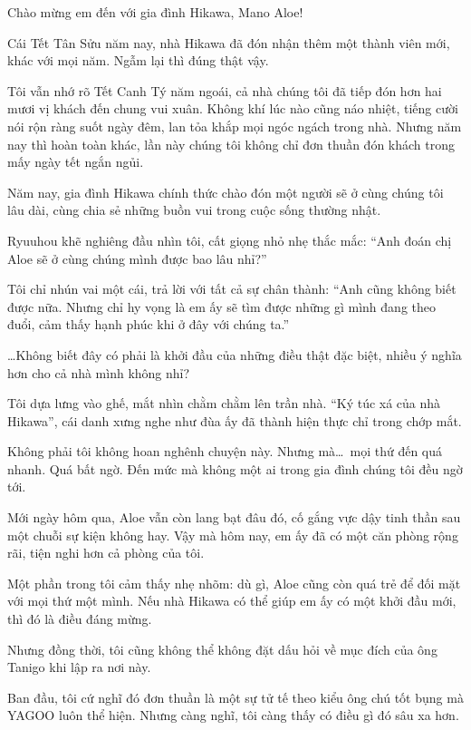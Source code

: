 \documentclass[../main.tex]{subfiles}
\begin{document}
Chào mừng em đến với gia đình Hikawa, Mano Aloe!

\il

Cái Tết Tân Sửu năm nay, nhà Hikawa đã đón nhận thêm một thành viên mới, khác với mọi năm. Ngẫm lại thì đúng thật vậy.

Tôi vẫn nhớ rõ Tết Canh Tý năm ngoái, cả nhà chúng tôi đã tiếp đón hơn hai mươi vị khách đến chung vui xuân. Không khí lúc nào cũng náo nhiệt, tiếng cười nói rộn ràng suốt ngày đêm, lan tỏa khắp mọi ngóc ngách trong nhà. Nhưng năm nay thì hoàn toàn khác, lần này chúng tôi không chỉ đơn thuần đón khách trong mấy ngày tết ngắn ngủi.

Năm nay, gia đình Hikawa chính thức chào đón một người sẽ ở cùng chúng tôi lâu dài, cùng chia sẻ những buồn vui trong cuộc sống thường nhật.

Ryuuhou khẽ nghiêng đầu nhìn tôi, cất giọng nhỏ nhẹ thắc mắc: ``Anh đoán chị Aloe sẽ ở cùng chúng mình được bao lâu nhỉ?''

Tôi chỉ nhún vai một cái, trả lời với tất cả sự chân thành: ``Anh cũng không biết được nữa. Nhưng chỉ hy vọng là em ấy sẽ tìm được những gì mình đang theo đuổi, cảm thấy hạnh phúc khi ở đây với chúng ta.''

\dots Không biết đây có phải là khởi đầu của những điều thật đặc biệt, nhiều ý nghĩa hơn cho cả nhà mình không nhỉ?

\il

Tôi dựa lưng vào ghế, mắt nhìn chằm chằm lên trần nhà. ``Ký túc xá của nhà Hikawa'', cái danh xưng nghe như đùa ấy đã thành hiện thực chỉ trong chớp mắt.

Không phải tôi không hoan nghênh chuyện này. Nhưng mà\dots\ mọi thứ đến quá nhanh. Quá bất ngờ. Đến mức mà không một ai trong gia đình chúng tôi đều ngờ tới.

Mới ngày hôm qua, Aloe vẫn còn lang bạt đâu đó, cố gắng vực dậy tinh thần sau một chuỗi sự kiện không hay. Vậy mà hôm nay, em ấy đã có một căn phòng rộng rãi, tiện nghi hơn cả phòng của tôi.

Một phần trong tôi cảm thấy nhẹ nhõm: dù gì, Aloe cũng còn quá trẻ để đối mặt với mọi thứ một mình. Nếu nhà Hikawa có thể giúp em ấy có một khởi đầu mới, thì đó là điều đáng mừng.

Nhưng đồng thời, tôi cũng không thể không đặt dấu hỏi về mục đích của ông Tanigo khi lập ra nơi này.

Ban đầu, tôi cứ nghĩ đó đơn thuần là một sự tử tế theo kiểu ông chú tốt bụng mà YAGOO luôn thể hiện. Nhưng càng nghĩ, tôi càng thấy có điều gì đó sâu xa hơn.
\end{document}
